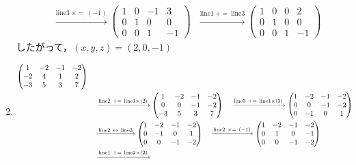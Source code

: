 \documentclass{ltjsarticle}
\begin{document}
\begin{enumerate}
\begin{align*}
 &\ \ \ \xrightarrow{ \text{line} 3 \ \times=\ \left( - 1 \right)} %
\begin{pmatrix}
 1 & 0 & -1 & 3\\
 0 & 1 & 0 & 0\\
 0 & 0 & 1 & -1
\end{pmatrix}
 \ \ \ \xrightarrow{ \text{line} 1 \ +=\  \text{line} 3 } %
\begin{pmatrix}
 1 & 0 & 0 & 2\\
 0 & 1 & 0 & 0\\
 0 & 0 & 1 & -1
\end{pmatrix}
\end{align*}
したがって，$(x, y, z)=(2, 0, -1)$
\setcounter{enumi}{5}
\item
\begin{align*}
\begin{pmatrix}
 1 & - 2 & -1 & - 2\\
 - 2 & 4 & 1 & 2\\
 - 3 & 5 & 3 & 7
\end{pmatrix}\allowdisplaybreaks\\
&\ \ \ \xrightarrow{ \text{line} 2 \ +=\  \text{line} 1 \times\left( 2 \right)} %
\begin{pmatrix}
 1 & - 2 & -1 & - 2\\
 0 & 0 & -1 & - 2\\
 - 3 & 5 & 3 & 7
\end{pmatrix}\ \ \ \xrightarrow{ \text{line} 3 \ +=\  \text{line} 1 \times\left( 3 \right)} %
\begin{pmatrix}
 1 & - 2 & -1 & - 2\\
 0 & 0 & -1 & - 2\\
 0 & -1 & 0 & 1
\end{pmatrix}\allowdisplaybreaks\\
&\ \ \ \xrightarrow{ \text{line} 2 \ \leftrightarrow\  \text{line} 3 } %
\begin{pmatrix}
 1 & - 2 & -1 & - 2\\
 0 & -1 & 0 & 1\\
 0 & 0 & -1 & - 2
\end{pmatrix}\ \ \ \xrightarrow{ \text{line} 2 \ \times=\ \left( - 1 \right)} %
\begin{pmatrix}
 1 & - 2 & -1 & - 2\\
 0 & 1 & 0 & -1\\
 0 & 0 & -1 & - 2
\end{pmatrix}\allowdisplaybreaks\\
&\ \ \ \xrightarrow{ \text{line} 1 \ +=\  \text{line} 2 \times\left( 2 \right)} %

\end{align*}
\end{enumerate}
\end{document}
